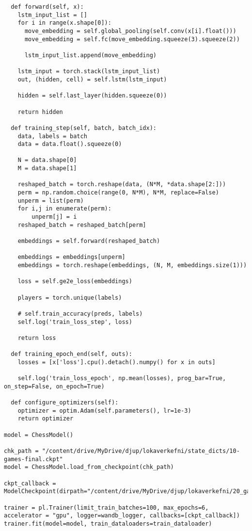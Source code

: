 \begin{verbatim}
  def forward(self, x):
    lstm_input_list = []
    for i in range(x.shape[0]):
      move_embedding = self.global_pooling(self.conv(x[i].float()))
      move_embedding = self.fc(move_embedding.squeeze(3).squeeze(2))

      lstm_input_list.append(move_embedding)

    lstm_input = torch.stack(lstm_input_list)
    out, (hidden, cell) = self.lstm(lstm_input)

    hidden = self.last_layer(hidden.squeeze(0))

    return hidden

  def training_step(self, batch, batch_idx):
    data, labels = batch
    data = data.float().squeeze(0)

    N = data.shape[0]
    M = data.shape[1]

    reshaped_batch = torch.reshape(data, (N*M, *data.shape[2:]))
    perm = np.random.choice(range(0, N*M), N*M, replace=False)
    unperm = list(perm)
    for i,j in enumerate(perm):
        unperm[j] = i
    reshaped_batch = reshaped_batch[perm]
    
    embeddings = self.forward(reshaped_batch)

    embeddings = embeddings[unperm]
    embeddings = torch.reshape(embeddings, (N, M, embeddings.size(1)))

    loss = self.ge2e_loss(embeddings)

    players = torch.unique(labels)

    # self.train_accuracy(preds, labels)
    self.log('train_loss_step', loss)

    return loss

  def training_epoch_end(self, outs):
    losses = [x['loss'].cpu().detach().numpy() for x in outs]

    self.log('train_loss_epoch', np.mean(losses), prog_bar=True, on_step=False, on_epoch=True)

  def configure_optimizers(self):
    optimizer = optim.Adam(self.parameters(), lr=1e-3)
    return optimizer

model = ChessModel()

chk_path = "/content/drive/MyDrive/djup/lokaverkefni/state_dicts/10-games-final.ckpt"
model = ChessModel.load_from_checkpoint(chk_path)

ckpt_callback = ModelCheckpoint(dirpath="/content/drive/MyDrive/djup/lokaverkefni/20_games/")

trainer = pl.Trainer(limit_train_batches=100, max_epochs=6, accelerator = "gpu", logger=wandb_logger, callbacks=[ckpt_callback])
trainer.fit(model=model, train_dataloaders=train_dataloader)


\end{verbatim}
